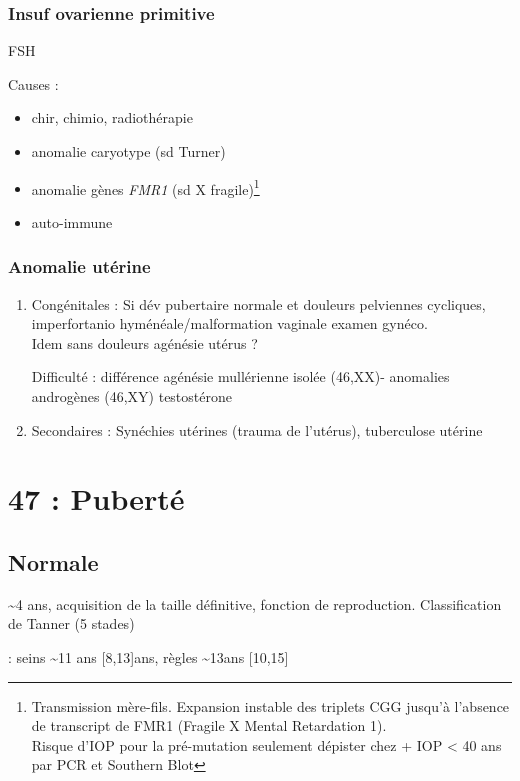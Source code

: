 \documentclass[11pt]{article}
\begin{document}
\subsubsection{Insuf ovarienne primitive}
\label{sec:org0ea0cdd}
\inc FSH

Causes :
\begin{itemize}
\item chir, chimio, radiothérapie
\item anomalie caryotype (sd Turner)
\item anomalie gènes \emph{FMR1} (sd X fragile)\footnote{Transmission mère-fils. Expansion instable des triplets CGG jusqu'à
l'absence de transcript de FMR1 (Fragile X Mental Retardation 1). \\
\danger Risque d'IOP pour la pré-mutation seulement \thus dépister chez
\female + IOP < 40 ans par PCR et Southern Blot}
\item auto-immune
\end{itemize}
\subsubsection{Anomalie utérine}
\label{sec:orgd60ea15}
\begin{enumerate}
\item Congénitales :
\label{sec:org6f15567}
Si dév pubertaire normale et douleurs pelviennes cycliques, imperfortanio
hyménéale/malformation vaginale \thus examen gynéco.\\
Idem sans douleurs \thus agénésie utérus ?

Difficulté : différence agénésie mullérienne isolée (46,XX)- anomalies androgènes
(46,XY) \thus testostérone
\item Secondaires :
\label{sec:org4cbcc40}
Synéchies utérines (trauma de l'utérus), tuberculose utérine
\end{enumerate}
\section{47 : Puberté}
\label{sec:org0ef8c38}
\subsection{Normale}
\label{sec:org54827ea}
\textasciitilde{}4 ans, acquisition de la taille définitive, fonction de
reproduction. Classification de Tanner (5 stades)

\female : seins \textasciitilde{}11 ans [8,13]ans, règles \textasciitilde{}13ans [10,15]
\end{document}
